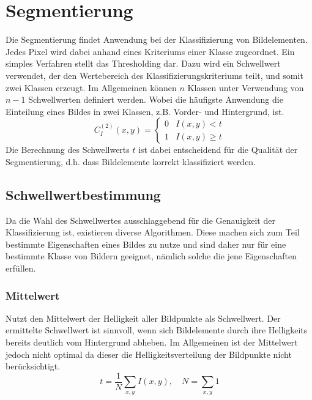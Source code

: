 \section{Segmentierung}
\writtenby{\dcauthornameewie}%
Die Segmentierung findet Anwendung bei der Klassifizierung von Bildelementen.
Jedes Pixel wird dabei anhand eines Kriteriums einer Klasse zugeordnet.
Ein simples Verfahren stellt das Thresholding dar.
Dazu wird ein Schwellwert verwendet, der den Wertebereich des Klassifizierungskriteriums teilt, und somit zwei Klassen erzeugt.
Im Allgemeinen können $n$ Klassen unter Verwendung von $n-1$ Schwellwerten definiert werden.
Wobei die häufigste Anwendung die Einteilung eines Bildes in zwei Klassen, z.B. Vorder- und Hintergrund, ist.
\begin{equation}
  C_I^{(2)}(x,y) = \begin{cases}
    0 & I(x,y) <    t \\
    1 & I(x,y) \geq t
  \end{cases}
\end{equation}
Die Berechnung des Schwellwerts $t$ ist dabei entscheidend für die Qualität der Segmentierung, d.h. dass Bildelemente korrekt klassifiziert werden.

\subsection*{Schwellwertbestimmung}
Da die Wahl des Schwellwertes ausschlaggebend für die Genauigkeit der Klassifizierung ist, existieren diverse Algorithmen.
Diese machen sich zum Teil bestimmte Eigenschaften eines Bildes zu nutze und sind daher nur für eine bestimmte Klasse von Bildern geeignet, nämlich solche die jene Eigenschaften erfüllen.

\subsubsection*{Mittelwert}
Nutzt den Mittelwert der Helligkeit aller Bildpunkte als Schwellwert.
Der ermittelte Schwellwert ist sinnvoll, wenn sich Bildelemente durch ihre Helligkeits bereits deutlich vom Hintergrund abheben.
Im Allgemeinen ist der Mittelwert jedoch nicht optimal da dieser die Helligkeitsverteilung der Bildpunkte nicht berücksichtigt.
\begin{equation}
  t = \frac{1}{N} \sum_{x,y} I(x,y), \quad N = \sum_{x,y} 1
\end{equation}

